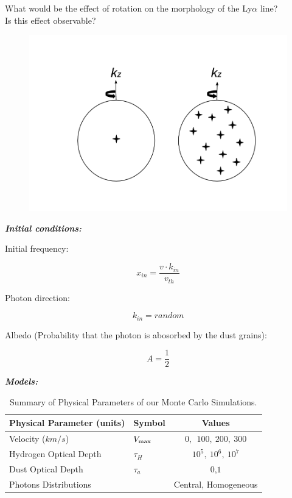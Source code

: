 \documentclass{beamer}
\begin{document}

\begin{frame}
\LARGE{What would be the effect of rotation on the morphology of the Ly$\alpha$ line?\\ 
Is this effect observable?} 
\end{frame}


\begin{frame}
\begin{figure}
\includegraphics[scale=0.3]{Figures/models.png}
\end{figure}
\end{frame}

\begin{frame}{\textit{\textbf{Initial conditions:}}}

Initial frequency:

\[
x_{in} = \dfrac{v\cdot k_{in}}{v_{th}}
\]

Photon direction:

\[
k_{in} = random
\]

Albedo (Probability that the photon is abosorbed by the dust grains):

\[
A = \dfrac{1}{2}
\]


\end{frame}

\begin{frame}{\textit{\textbf{Models:}}}
\begin{table}
\begin{center}
\begin{tabular}{llc}\hline\hline
Physical Parameter (units) & Symbol & Values\\\hline
Velocity ($km/s$) & $V_{\rm max}$&$0,\ \ 100,\ 200,\ 300$\\
Hydrogen Optical Depth & $\tau_{H} $ & $10^{5},\ 10^{6},\ 10^{7}$\\
Dust Optical Depth & $\tau_{a}$ & $0$,$1$\\
Photons Distributions & & Central, Homogeneous\\\hline\hline
\end{tabular}
\caption{Summary of Physical Parameters of our Monte Carlo Simulations.}
\end{center}
\end{table}
\end{frame}
\end{document}
